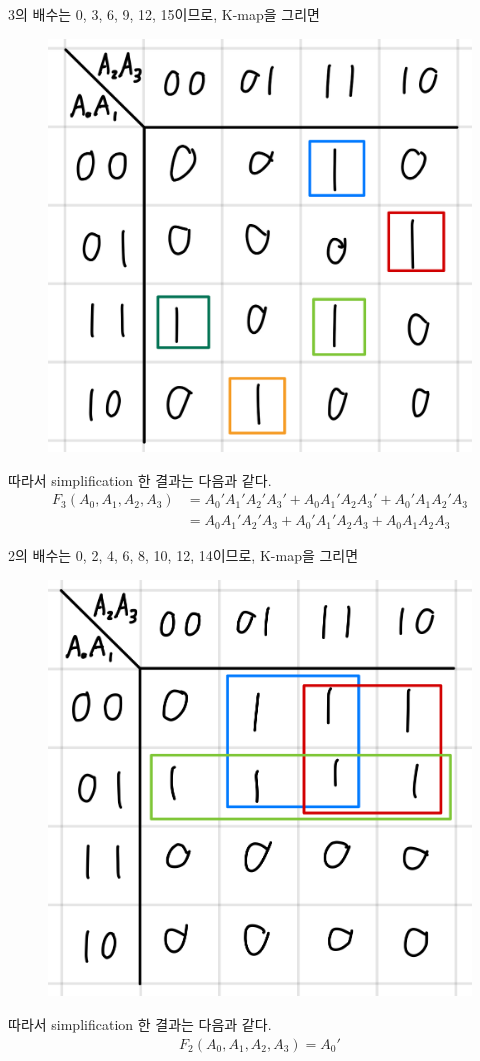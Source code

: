\documentclass{scrartcl}
\begin{document}
3의 배수는 0, 3, 6, 9, 12, 15이므로, K-map을 그리면
\begin{figure}[H]
  \centering
  \includegraphics[width=0.3\linewidth]{lab3_2_3_km}
\end{figure}
따라서 simplification 한 결과는 다음과 같다.
\begin{align*}
  F_3(A_0, A_1, A_2, A_3) &= A_0' A_1' A_2' A_3' + A_0 A_1' A_2 A_3' + A_0' A_1 A_2' A_3 \\
                          &= A_0 A_1' A_2' A_3 + A_0' A_1' A_2 A_3 + A_0 A_1 A_2 A_3
\end{align*}

2의 배수는 0, 2, 4, 6, 8, 10, 12, 14이므로, K-map을 그리면
\begin{figure}[H]
  \centering
  \includegraphics[width=0.3\linewidth]{lab3_2_2_km}
\end{figure}
따라서 simplification 한 결과는 다음과 같다.
\begin{align*}
  F_2(A_0, A_1, A_2, A_3) = A_0'
\end{align*}
\end{document}

